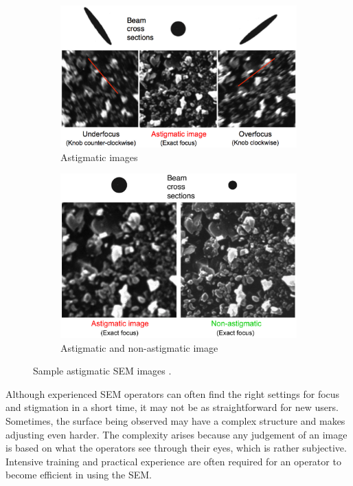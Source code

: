 \documentclass[conference]{IEEEtran}
\begin{document}
\begin{figure}[htbp]
    \centering
    \begin{subfigure}{0.4\textwidth}
        \centering
        \includegraphics[width=1\textwidth]{Images/B astigmatic a.jpeg}
        \caption{Astigmatic images}
        \label{B astigmatic a}
    \end{subfigure}
    \begin{subfigure}{0.4\textwidth}
        \centering
        \includegraphics[width=1\textwidth]{Images/B astigmatic b.jpeg}
        \caption{Astigmatic and non-astigmatic image}
        \label{B astigmatic b}
    \end{subfigure}
    \caption{Sample astigmatic SEM images \cite{SEM astigmatism correction}.}
    \label{Sample astigmatic SEM images}
\end{figure}

Although experienced SEM operators can often find the right settings for focus and stigmation in a short time, it may not be as straightforward for new users. Sometimes, the surface being observed may have a complex structure and makes adjusting even harder. The complexity arises because any judgement of an image is based on what the operators see through their eyes, which is rather subjective. Intensive training and practical experience are often required for an operator to become efficient in using the SEM.
\end{document}
